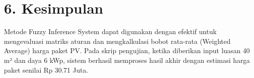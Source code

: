 \documentclass{article}
\begin{document}
\section*{6. Kesimpulan}
Metode Fuzzy Inference System dapat digunakan dengan efektif untuk mengevaluasi matriks aturan dan mengkalkulasi bobot rata-rata (Weighted Average) harga paket PV. Pada skrip pengujian, ketika diberikan input luasan 40 m² dan daya 6 kWp, sistem berhasil memproses hasil akhir dengan estimasi harga paket senilai Rp 30.71 Juta.
\end{document}
